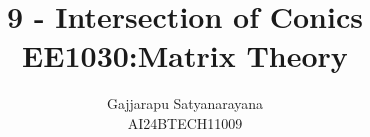 \documentclass[journal]{IEEEtran}
\begin{document}

\vspace{3cm}

\title{
9 - Intersection of Conics \\
\large EE1030:Matrix Theory
}
\author{Gajjarapu Satyanarayana\\AI24BTECH11009
}
{\let\newpage\relax\maketitle}

\renewcommand{\thefigure}{\theenumi}
\renewcommand{\thetable}{\theenumi}



\renewcommand{\thetable}{\theenumi}
\end{document}
